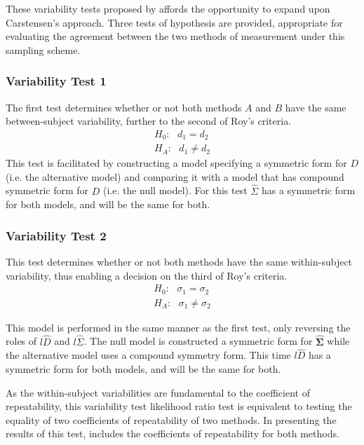 \documentclass[12pt, a4paper]{report}
\theoremstyle{plain}
\theoremstyle{definition}
\theoremstyle{remark}
\begin{document}
	
	
These variability tests proposed by \citet{ARoy2009} affords the opportunity to expand upon Carstensen's approach. Three tests of hypothesis are provided, appropriate for evaluating the agreement between the two methods of measurement under this sampling scheme. 
	
\subsubsection{Variability Test 1}
	The first test determines whether or not both methods $A$ and $B$ have the same between-subject variability, further to the second of Roy's criteria.
	\begin{eqnarray*}
		H_{0}: \mbox{ }d_{1}  = d_{2} \\
		H_{A}: \mbox{ }d_{1}  \neq d_{2}
	\end{eqnarray*}
	This test is facilitated by constructing a model specifying a symmetric form for $D$ (i.e. the alternative model) and comparing it with a model that has compound symmetric form for $D$ (i.e. the null model). For this test ${\hat{\Sigma}}$ has a symmetric form for both models, and will be the same for both.
		
	\subsubsection{Variability Test 2}
	
	This test determines whether or not both methods have the same within-subject variability, thus enabling a decision on the third of Roy's criteria.
	\begin{eqnarray*}
		H_{0}: \mbox{ }\sigma_{1}  = \sigma_{2} \\
		H_{A}: \mbox{ }\sigma_{1}  \neq \sigma_{2}
	\end{eqnarray*}
	
	This model is performed in the same manner as the first test, only reversing the roles of $l{\hat{D}}$ and $l{\hat{\Sigma}}$. The null model is constructed a symmetric form for $\boldsymbol{\hat{\Sigma}}$ while the alternative model uses a compound symmetry form. This time $l{\hat{D}}$ has a symmetric form for both models, and will be the same for both.
	
	As the within-subject variabilities are fundamental to the coefficient of repeatability, this variability test likelihood ratio test is equivalent to testing the equality of two coefficients of repeatability of two methods. In presenting the results of this test, \citet{ARoy2009} includes the coefficients of repeatability for both methods.
\end{document}
